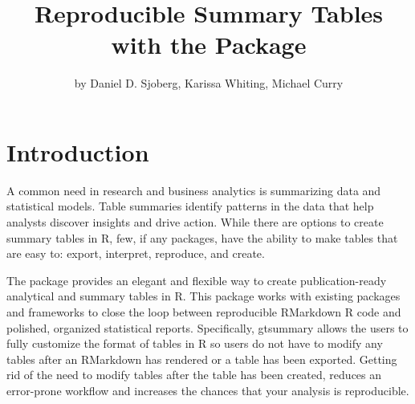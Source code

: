 \title{Reproducible Summary Tables with the  Package}
\author{by Daniel D. Sjoberg, Karissa Whiting, Michael Curry}

\maketitle



\section{Introduction}
A common need in research and business analytics is summarizing data and statistical models.
Table summaries identify patterns in the data that help analysts discover insights and drive action.
While there are options to create summary tables in R, few, if any packages, have the ability to make tables that are easy to: export, interpret, reproduce, and create. 

The  \citep{gtsummary} package provides an elegant and flexible way to create publication-ready analytical and summary tables in R.
This package works with existing packages and frameworks to close the loop between reproducible RMarkdown R code and polished, organized statistical reports.
Specifically, gtsummary allows the users to fully customize the format of tables in R so users do not have to modify any tables after an RMarkdown has rendered or a table has been exported.
Getting rid of the need to modify tables after the table has been created, reduces an error-prone workflow and increases the chances that your analysis is reproducible. 

